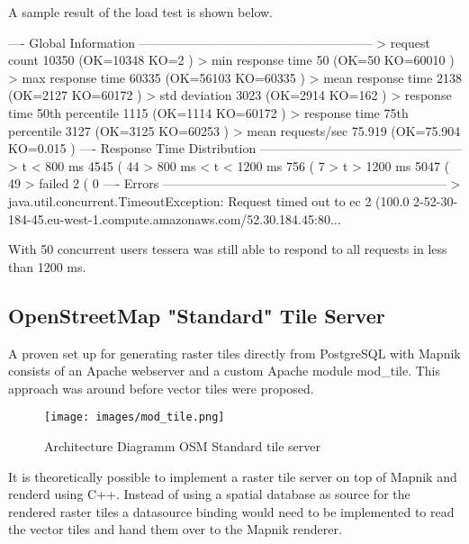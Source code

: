 A sample result of the load test is shown below.

\begin{bashcode}
---- Global Information --------------------------------------------------------
> request count                                      10350 (OK=10348  KO=2     )
> min response time                                     50 (OK=50     KO=60010 )
> max response time                                  60335 (OK=56103  KO=60335 )
> mean response time                                  2138 (OK=2127   KO=60172 )
> std deviation                                       3023 (OK=2914   KO=162   )
> response time 50th percentile                       1115 (OK=1114   KO=60172 )
> response time 75th percentile                       3127 (OK=3125   KO=60253 )
> mean requests/sec                                 75.919 (OK=75.904 KO=0.015 )
---- Response Time Distribution ------------------------------------------------
> t < 800 ms                                          4545 ( 44%
> 800 ms < t < 1200 ms                                 756 (  7%
> t > 1200 ms                                         5047 ( 49%
> failed                                                 2 (  0%
---- Errors --------------------------------------------------------------------
> java.util.concurrent.TimeoutException: Request timed out to ec      2 (100.0%
2-52-30-184-45.eu-west-1.compute.amazonaws.com/52.30.184.45:80...
\end{bashcode}

With 50 concurrent users tessera was still able to respond to all requests in less than 1200 ms.

\subsection{OpenStreetMap "Standard" Tile Server}\label{osm_standard_tile_server}

A proven set up for generating raster tiles directly from PostgreSQL with Mapnik consists of an Apache webserver and a custom Apache module mod\_tile\cite{16_wiki.openstreetmap.org_2015}. This approach was around before vector tiles were proposed.

\begin{figure}[H]
\centering
  \texttt{[image: images/mod\_tile.png]}
  \caption{Architecture Diagramm OSM Standard tile server}
\end{figure}

It is theoretically possible to implement a raster tile server
on top of Mapnik and renderd using C++. Instead of using a spatial database as source for the rendered raster tiles a datasource binding would need to be implemented to read the vector tiles and hand them over to the Mapnik renderer. 

